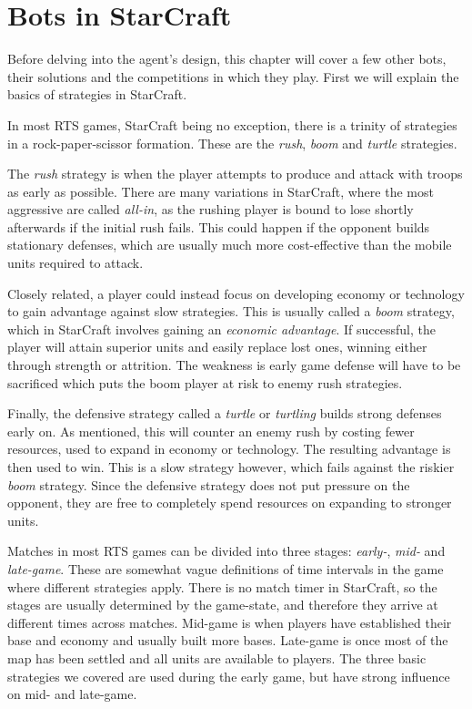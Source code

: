 \chapter{Bots in StarCraft}
\label{ch:related}
Before delving into the agent's design, this chapter will cover a few other bots, their solutions and the competitions in which they play. First we will explain the basics of strategies in StarCraft.

In most RTS games, StarCraft being no exception, there is a trinity of strategies in a rock-paper-scissor formation. These are the \emph{rush}, \emph{boom} and \emph{turtle} strategies.

The \emph{rush} strategy is when the player attempts to produce and attack with troops as early as possible. There are many variations in StarCraft, where the most aggressive are called \emph{all-in}, as the rushing player is bound to lose shortly afterwards if the initial rush fails. This could happen if the opponent builds stationary defenses, which are usually much more cost-effective than the mobile units required to attack.

Closely related, a player could instead focus on developing economy or technology to gain advantage against slow strategies. This is usually called a \emph{boom} strategy, which in StarCraft involves gaining an \emph{economic advantage}. If successful, the player will attain superior units and easily replace lost ones, winning either through strength or attrition. The weakness is early game defense will have to be sacrificed which puts the boom player at risk to enemy rush strategies.

Finally, the defensive strategy called a \emph{turtle} or \emph{turtling} builds strong defenses early on. As mentioned, this will counter an enemy rush by costing fewer resources, used to expand in economy or technology. The resulting advantage is then used to win. This is a slow strategy however, which fails against the riskier \emph{boom} strategy. Since the defensive strategy does not put pressure on the opponent, they are free to completely spend resources on expanding to stronger units.

Matches in most RTS games can be divided into three stages: \emph{early-}, \emph{mid-} and \emph{late-game}. These are somewhat vague definitions of time intervals in the game where different strategies apply. There is no match timer in StarCraft, so the stages are usually determined by the game-state, and therefore they arrive at different times across matches. Mid-game is when players have established their base and economy and usually built more bases. Late-game is once most of the map has been settled and all units are available to players. The three basic strategies we covered are used during the early game, but have strong influence on mid- and late-game.

